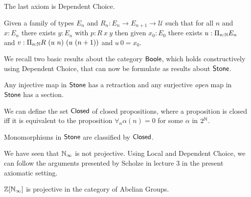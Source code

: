 The last axiom is Dependent Choice.

\begin{axiom}
  Given a family of types $E_n$ and $R_n:E_n\rightarrow E_{n+1}\rightarrow {\mathcal U}$ such that
  for all $n$ and $x:E_n$ there exists $y:E_n$ with $p:R~x~y$ then given $x_0:E_0$ there exists
  $u:\Pi_{n:\mathbb{N}}E_n$ and $v:\Pi_{n:\mathbb{N}}R~(u~n)~(u~(n+1))$ and $u~0 = x_0$.
\end{axiom}

\medskip

We recall two basic results about the category $\mathsf{Boole}$, which holds constructively using Dependent Choice,
that can now be formulate as results about $\mathsf{Stone}$.

\begin{proposition}
  Any injective map in $\mathsf{Stone}$ has a retraction and any surjective {\em open} map in $\mathsf{Stone}$ has a section.
\end{proposition}

\medskip

We can define the set $\mathsf{Closed}$ of closed propositions, where a proposition is closed iff it is equivalent to
the proposition $\forall_n \alpha(n) = 0$ for some $\alpha$ in $2^{\mathbb{N}}$.

\begin{theorem}
  Monomorphisms in $\mathsf{Stone}$ are classified by $\mathsf{Closed}$.
\end{theorem}

\medskip

We have seen that $\mathbb{N}_{\infty}$ is not projective. Using Local and Dependent Choice, we can 
follow the arguments presented by Scholze in lecture 3 in the present axiomatic setting. 

\begin{theorem}
  $\mathbb{Z}[\mathbb{N}_{\infty}]$ is projective in the category of Abelian Groups.
\end{theorem}

